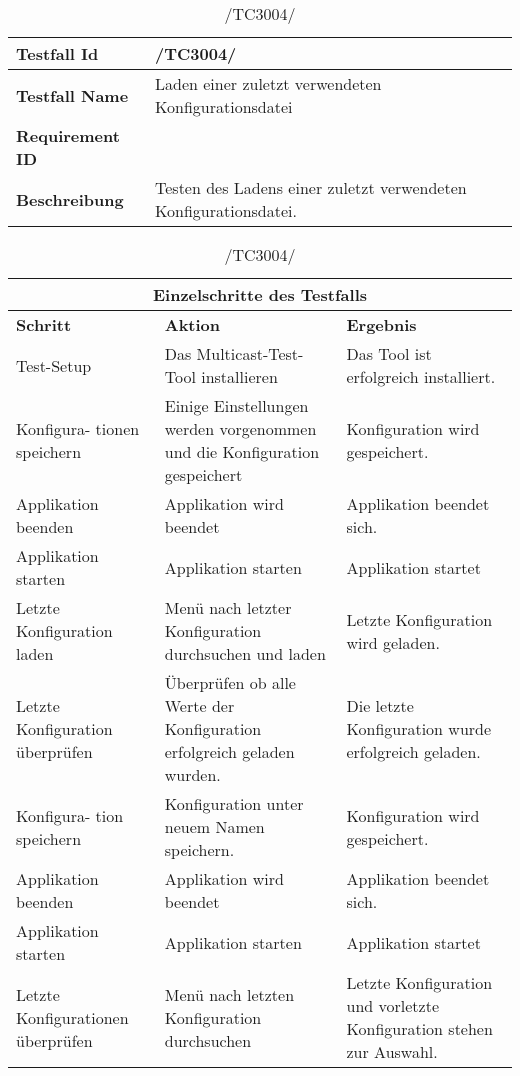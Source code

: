 \begin{table}[h]
\caption{/TC3004/}
\label{tab:TC3004}
\begin{center}
\begin{tabular}{|p{3.5cm}|p{9cm}|}
\hline
\textbf{Testfall Id} & /TC3004/\\
\hline
\textbf{Testfall Name} & Laden einer zuletzt verwendeten Konfigurationsdatei \\
\hline
\textbf{Requirement ID} &  \\
\hline
\textbf{Beschreibung} & Testen des Ladens einer zuletzt verwendeten Konfigurationsdatei.\\
\hline
\end{tabular}
\begin{tabular}{|p{2.5cm}|p{5cm}|p{4.55cm}|}

\multicolumn{3}{|c|}{\textbf{Einzelschritte des Testfalls}} \\
\hline
\textbf{Schritt} & \textbf{Aktion} & \textbf{Ergebnis}\\
\hline
Test-Setup & Das Multicast-Test-Tool installieren & Das Tool ist erfolgreich installiert. \\
\hline
Konfigura- tionen speichern & Einige Einstellungen werden vorgenommen und die Konfiguration gespeichert & Konfiguration wird gespeichert.\\
\hline
Applikation beenden & Applikation wird beendet & Applikation beendet sich.\\
\hline
Applikation starten & Applikation starten & Applikation startet\\
\hline
Letzte Konfiguration laden & Menü nach letzter Konfiguration durchsuchen und laden & Letzte Konfiguration wird geladen.\\
\hline
Letzte Konfiguration überprüfen & Überprüfen ob alle Werte der Konfiguration erfolgreich geladen wurden. & Die letzte Konfiguration wurde erfolgreich geladen.\\
\hline
Konfigura- tion speichern & Konfiguration unter neuem Namen speichern. & Konfiguration wird gespeichert. \\
\hline
Applikation beenden & Applikation wird beendet & Applikation beendet sich.\\
\hline
Applikation starten & Applikation starten & Applikation startet\\
\hline
Letzte Konfigurationen überprüfen & Menü nach letzten Konfiguration durchsuchen & Letzte Konfiguration und vorletzte Konfiguration stehen zur Auswahl.\\
\hline
\end{tabular}
\end{center}
\label{default}


\end{table}

